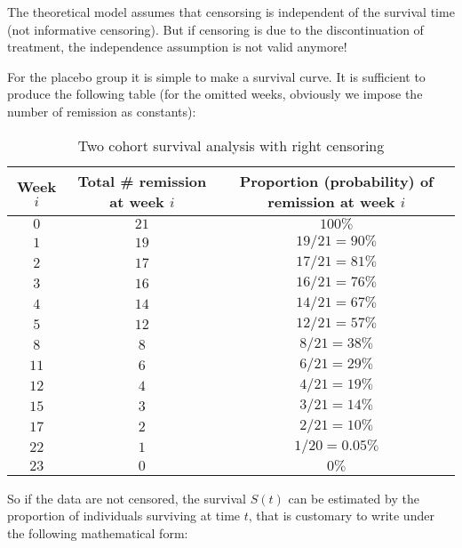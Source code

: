 	\begin{tcolorbox}[title=Remark,colframe=black,arc=10pt]
	The theoretical model assumes that censorsing is independent of the survival time (not informative censoring). But if censoring is due to the discontinuation of treatment, the independence assumption is not valid anymore!
	\end{tcolorbox}
	For the placebo group it is simple to make a survival curve. It is sufficient to produce the following table (for the omitted weeks, obviously we impose the number of remission as constants):
	\begin{table}[H]\centering
	\begin{center}
			\begin{tabular}{|c|c|c|}
				\hline
				\multicolumn{1}{c}{\cellcolor{black!30}\textbf{Week $i$}} & 
  \multicolumn{1}{c}{\cellcolor{black!30}\textbf{Total \# remission at week $i$}} & 
  \multicolumn{1}{c}{\cellcolor{black!30}\textbf{Proportion (probability) of remission at week $i$}} \\ \hline
				 $0$ & $21$ & $100\%$ \\ \hline
				 $1$ & $19$ & $19/21=90\%$ \\ \hline
				 $2$ & $17$ & $17/21=81\%$ \\ \hline
				 $3$ & $16$ & $16/21=76\%$ \\ \hline
				 $4$ & $14$ & $14/21=67\%$ \\ \hline
				 $5$ & $12$ & $12/21=57\%$ \\ \hline
				 $8$ & $8$ & $8/21=38\%$ \\ \hline
				 $11$ & $6$ & $6/21=29\%$ \\ \hline
				 $12$ & $4$ & $4/21=19\%$ \\ \hline
				 $15$ & $3$ & $3/21=14\%$ \\ \hline
				 $17$ & $2$ & $2/21=10\%$ \\ \hline
				 $22$ & $1$ & $1/20=0.05\%$ \\ \hline
				 $23$ & $0$ & $0\%$ \\ \hline
		\end{tabular}
	\end{center}
	\caption[]{Two cohort survival analysis with right censoring}
	\end{table}
	So if the data are not censored, the survival $S(t)$ can be estimated by the proportion of individuals surviving at time $t$, that is customary to write under the following mathematical form:
	
